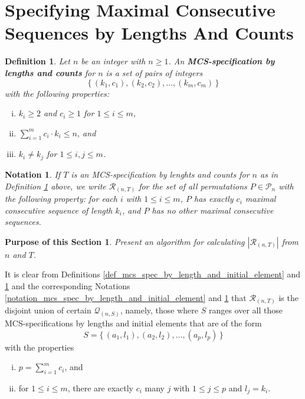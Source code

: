 \documentclass{article}
\newtheorem{definition}[theorem]{Definition}
\newtheorem{notation}[theorem]{Notation}
\newtheorem{purpose}{Purpose of this Section}
\begin{document}
\section{Specifying Maximal Consecutive Sequences by Lengths And Counts}

\begin{definition} \label{def_mcs_spec_by_length_and_count}
  Let $n$ be an integer with $n\geq 1$. An {\bf MCS-specification by lengths and counts} for $n$ is a
  set of pairs of integers $$\{\,(k_1, c_1), (k_2, c_2), \ldots,(k_m, c_m)\,\}$$ with the following properties:
  \begin{enumerate}[(i)]
  \item
    $k_i \geq 2$ and $c_i \geq 1$ for $1\leq i \leq m$,
  \item
    $\sum_{i=1}^m c_i \cdot k_i \leq n$, and
  \item
    $k_i \neq k_j$ for $1\leq i, j \leq m$.
  \end{enumerate}
\end{definition}

\begin{notation}\label{notation_mcs_spec_by_length_and_count}
  If $T$ is an MCS-specification by lenghts and counts for $n$ as in
  Definition \ref{def_mcs_spec_by_length_and_count}
  above, we write ${\mathcal R}_{(n,T)}$ for the set of all permutations
  $P \in {\mathcal P}_n$ with the following property: for each $i$ with $1\leq i \leq m$, $P$ has exactly $c_i$
  maximal consecutive sequence of length $k_i$, and $P$ has no other maximal
  consecutive sequences.
\end{notation}

\begin{purpose}
Present an algorithm for calculating $|{\mathcal R}_{(n,T)}|$
from $n$ and $T$.
\end{purpose}

It is clear from Definitions \ref{def_mcs_spec_by_length_and_initial_element}
and \ref{def_mcs_spec_by_length_and_count} and the corresponding Notations
\ref{notation_mcs_spec_by_length_and_initial_element} and \ref{notation_mcs_spec_by_length_and_count} that
${\mathcal R}_{(n,T)}$ is the disjoint union of certain ${\mathcal Q}_{(n,S)}$, namely, those
where $S$ ranges over all those
MCS-specifications by lengths and initial elements that are of the form
$$S = \{\,(a_1, l_1), (a_2, l_2), \ldots,(a_p, l_p)\,\}$$
with the properties
\begin{enumerate}[(i)]
\item
  $p = \sum_{i=1}^m c_i$, and 
\item
  for $1\leq i \leq m$, there are exactly $c_i$ many $j$ with $1\leq j \leq p$ and $l_j = k_i$.
\end{enumerate}
\end{document}
